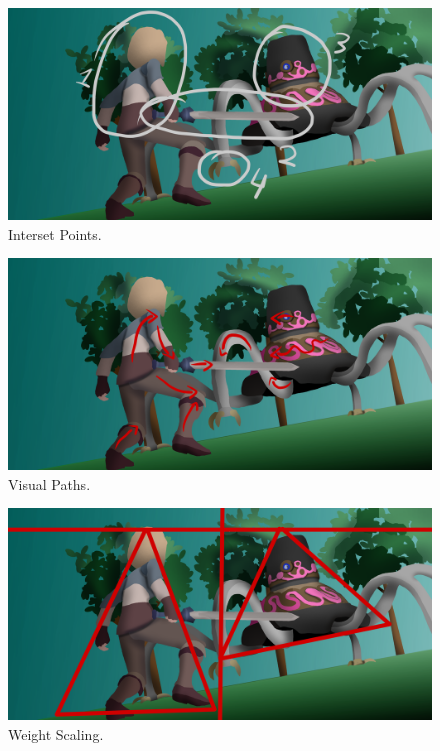 \documentclass{cup-pan}
\begin{document}
            \begin{figure}[H]
                \includegraphics[width=\textwidth]{Imagenes/Fanart2/Analysis/puntos_interes.png}
                \caption{Interset Points.}
            \end{figure}

            \begin{figure}[H]
                \includegraphics[width=\textwidth]{Imagenes/Fanart2/Analysis/recorridos.png}
                \caption{Visual Paths.}
            \end{figure}

            \begin{figure}[H]
                \includegraphics[width=\textwidth]{Imagenes/Fanart2/Analysis/balanza.png}
                \caption{Weight Scaling.}
            \end{figure}
\end{document}

